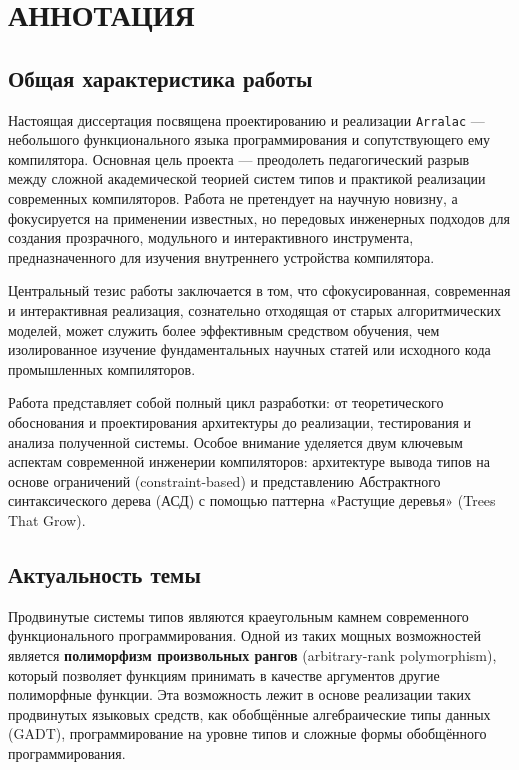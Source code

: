\chapter*{АННОТАЦИЯ}

\section*{Общая характеристика работы}

Настоящая диссертация посвящена проектированию и реализации \texttt{Arralac} — небольшого функционального языка программирования и сопутствующего ему компилятора. Основная цель проекта — преодолеть педагогический разрыв между сложной академической теорией систем типов и практикой реализации современных компиляторов. Работа не претендует на научную новизну, а фокусируется на применении известных, но передовых инженерных подходов для создания прозрачного, модульного и интерактивного инструмента, предназначенного для изучения внутреннего устройства компилятора.

Центральный тезис работы заключается в том, что сфокусированная, современная и интерактивная реализация, сознательно отходящая от старых алгоритмических моделей, может служить более эффективным средством обучения, чем изолированное изучение фундаментальных научных статей или исходного кода промышленных компиляторов.

Работа представляет собой полный цикл разработки: от теоретического обоснования и проектирования архитектуры до реализации, тестирования и анализа полученной системы. Особое внимание уделяется двум ключевым аспектам современной инженерии компиляторов: архитектуре вывода типов на основе ограничений (constraint-based) и представлению Абстрактного синтаксического дерева (АСД) с помощью паттерна «Растущие деревья» (Trees That Grow).

\section*{Актуальность темы}

Продвинутые системы типов являются краеугольным камнем современного функционального программирования. Одной из таких мощных возможностей является \textbf{полиморфизм произвольных рангов} (arbitrary-rank polymorphism), который позволяет функциям принимать в качестве аргументов другие полиморфные функции. Эта возможность лежит в основе реализации таких продвинутых языковых средств, как обобщённые алгебраические типы данных (GADT), программирование на уровне типов и сложные формы обобщённого программирования.


